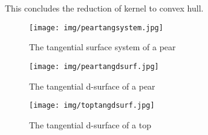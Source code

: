 \documentclass[12pt]{article}
\begin{document}
This concludes the reduction of kernel to convex hull.

\begin{figure}[h]
\begin{center}
\texttt{[image: img/peartangsystem.jpg]}
\end{center}
\caption{The tangential surface system of a pear}
\label{fig:peartangsystem}
\end{figure}

\clearpage

\begin{figure}
\begin{center}
\texttt{[image: img/peartangdsurf.jpg]}
\end{center}
\caption{The tangential d-surface of a pear}
\label{fig:peartangdsurf}
\end{figure}

\begin{figure}
\begin{center}
\texttt{[image: img/toptangdsurf.jpg]}
\end{center}
\caption{The tangential d-surface of a top}
\label{fig:toptangdsurf}
\end{figure}

\clearpage




\end{document}
